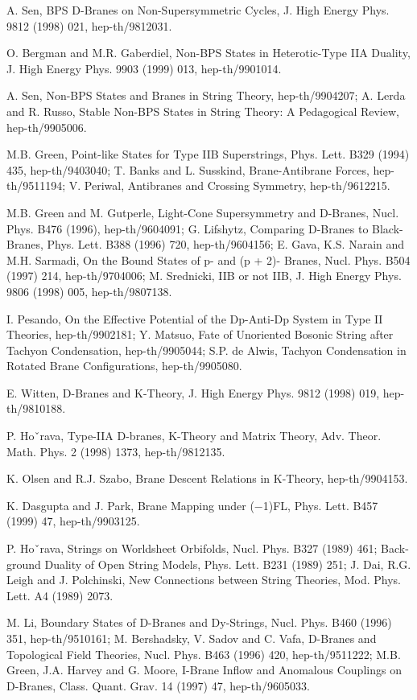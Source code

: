 \documentclass[11pt,a4paper]{ctexart}
\begin{document}
\begin{enumerate}[label={[\arabic*]},leftmargin=*,itemsep=2pt]
\item A. Sen, BPS D-Branes on Non-Supersymmetric Cycles, J. High Energy Phys. 9812 (1998) 021, hep-th/9812031.
\item O. Bergman and M.R. Gaberdiel, Non-BPS States in Heterotic-Type IIA Duality, J. High Energy Phys. 9903 (1999) 013, hep-th/9901014.
\item A. Sen, Non-BPS States and Branes in String Theory, hep-th/9904207; A. Lerda and R. Russo, Stable Non-BPS States in String Theory: A Pedagogical Review, hep-th/9905006.
\item M.B. Green, Point-like States for Type IIB Superstrings, Phys. Lett. B329 (1994) 435, hep-th/9403040; T. Banks and L. Susskind, Brane-Antibrane Forces, hep-th/9511194; V. Periwal, Antibranes and Crossing Symmetry, hep-th/9612215.
\item M.B. Green and M. Gutperle, Light-Cone Supersymmetry and D-Branes, Nucl. Phys. B476 (1996), hep-th/9604091; G. Lifshytz, Comparing D-Branes to Black-Branes, Phys. Lett. B388 (1996) 720, hep-th/9604156; E. Gava, K.S. Narain and M.H. Sarmadi, On the Bound States of p- and (p + 2)- Branes, Nucl. Phys. B504 (1997) 214, hep-th/9704006; M. Srednicki, IIB or not IIB, J. High Energy Phys. 9806 (1998) 005, hep-th/9807138.
\item I. Pesando, On the Effective Potential of the Dp-Anti-Dp System in Type II Theories, hep-th/9902181; Y. Matsuo, Fate of Unoriented Bosonic String after Tachyon Condensation, hep-th/9905044; S.P. de Alwis, Tachyon Condensation in Rotated Brane Configurations, hep-th/9905080.
\item E. Witten, D-Branes and K-Theory, J. High Energy Phys. 9812 (1998) 019, hep-th/9810188.
\item P. Hoˇrava, Type-IIA D-branes, K-Theory and Matrix Theory, Adv. Theor. Math. Phys. 2 (1998) 1373, hep-th/9812135.
\item K. Olsen and R.J. Szabo, Brane Descent Relations in K-Theory, hep-th/9904153.
\item K. Dasgupta and J. Park, Brane Mapping under (−1)FL, Phys. Lett. B457 (1999) 47, hep-th/9903125.
\item P. Hoˇrava, Strings on Worldsheet Orbifolds, Nucl. Phys. B327 (1989) 461; Back- ground Duality of Open String Models, Phys. Lett. B231 (1989) 251; J. Dai, R.G. Leigh and J. Polchinski, New Connections between String Theories, Mod. Phys. Lett. A4 (1989) 2073.
\item M. Li, Boundary States of D-Branes and Dy-Strings, Nucl. Phys. B460 (1996) 351, hep-th/9510161; M. Bershadsky, V. Sadov and C. Vafa, D-Branes and Topological Field Theories, Nucl. Phys. B463 (1996) 420, hep-th/9511222; M.B. Green, J.A. Harvey and G. Moore, I-Brane Inflow and Anomalous Couplings on D-Branes, Class. Quant. Grav. 14 (1997) 47, hep-th/9605033.

\end{enumerate}
\end{document}

